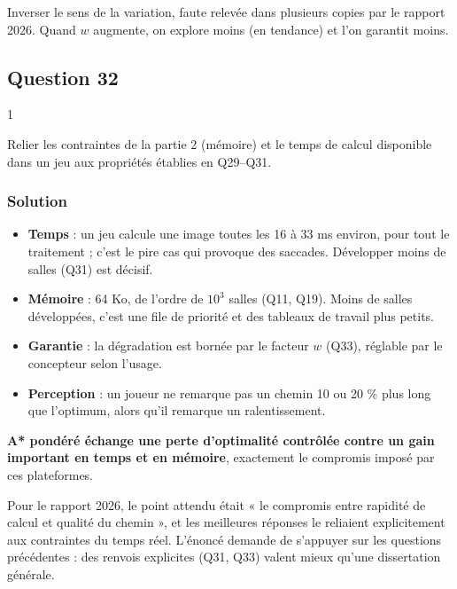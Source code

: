 \documentclass[11pt,a4paper]{article}
\providecommand{\tightlist}{\setlength{\itemsep}{0pt}\setlength{\parskip}{0pt}}
\begin{document}
\begin{piege}

Inverser le sens de la variation, faute relevée dans plusieurs copies par le rapport 2026. Quand \(w\) augmente, on explore moins (en tendance) et l'on garantit moins.

\end{piege}

\hypertarget{question-32}{%
\subsection{Question 32}\label{question-32}}

\begin{indication}{1}

Relier les contraintes de la partie 2 (mémoire) et le temps de calcul disponible dans un jeu aux propriétés établies en Q29--Q31.

\end{indication}

\hypertarget{solution-31}{%
\subsubsection{Solution}\label{solution-31}}

\begin{itemize}
\tightlist
\item
  \textbf{Temps} : un jeu calcule une image toutes les 16 à 33 ms environ, pour tout le traitement ; c'est le pire cas qui provoque des saccades. Développer moins de salles (Q31) est décisif.
\item
  \textbf{Mémoire} : 64 Ko, de l'ordre de \(10^3\) salles (Q11, Q19). Moins de salles développées, c'est une file de priorité et des tableaux de travail plus petits.
\item
  \textbf{Garantie} : la dégradation est bornée par le facteur \(w\) (Q33), réglable par le concepteur selon l'usage.
\item
  \textbf{Perception} : un joueur ne remarque pas un chemin 10 ou 20 \% plus long que l'optimum, alors qu'il remarque un ralentissement.
\end{itemize}

\textbf{A* pondéré échange une perte d'optimalité contrôlée contre un gain important en temps et en mémoire}, exactement le compromis imposé par ces plateformes.

\begin{jury}

Pour le rapport 2026, le point attendu était « le compromis entre rapidité de calcul et qualité du chemin », et les meilleures réponses le reliaient explicitement aux contraintes du temps réel. L'énoncé demande de s'appuyer sur les questions précédentes : des renvois explicites (Q31, Q33) valent mieux qu'une dissertation générale.

\end{jury}
\end{document}
